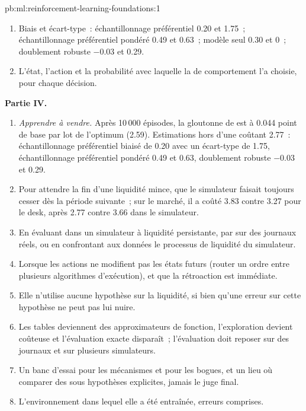 \begin{solution}{pb:ml:reinforcement-learning-foundations:1}
\begin{enumerate}[resume]
\item Biais et écart-type~: échantillonnage préférentiel 0.20 et 1.75~; échantillonnage préférentiel pondéré 0.49 et 0.63~; modèle seul 0.30 et 0~; doublement
robuste $-0.03$ et 0.29.
\item L'état, l'action et la probabilité avec laquelle la  de comportement l'a choisie, pour chaque décision.
\end{enumerate}
\textbf{Partie IV.}
\begin{enumerate}[resume]
\item \emph{Apprendre à vendre.} Après 10\,000 épisodes, la  gloutonne de  est à 0.044 point de base par lot
de l'optimum (2.59). Estimations hors  d'une  coûtant 2.77~: échantillonnage préférentiel biaisé de 0.20 avec un écart-type de 1.75, échantillonnage préférentiel pondéré
0.49 et 0.63, doublement robuste $-0.03$ et 0.29.
\item Pour attendre la fin d'une liquidité mince, que le simulateur faisait toujours cesser dès la période suivante~; sur le marché, il a coûté 3.83 contre
3.27 pour le desk, après 2.77 contre 3.66 dans le simulateur.
\item En évaluant dans un simulateur à liquidité persistante, par  sur des journaux réels, ou en confrontant
aux données le processus de liquidité du simulateur.
\item Lorsque les actions ne modifient pas les états futurs (router un ordre entre plusieurs algorithmes d'exécution), et que la rétroaction est immédiate.
\item Elle n'utilise aucune hypothèse sur la liquidité, si bien qu'une erreur sur cette hypothèse ne peut pas lui nuire.
\item Les tables deviennent des approximateurs de fonction, l'exploration devient coûteuse et l'évaluation exacte disparaît~; l'évaluation doit
reposer sur des journaux et sur plusieurs simulateurs.
\item Un banc d'essai pour les mécanismes et pour les bogues, et un lieu où comparer des  sous hypothèses explicites, jamais le
juge final.
\item L'environnement dans lequel elle a été entraînée, erreurs comprises.
\end{enumerate}
\end{solution}

